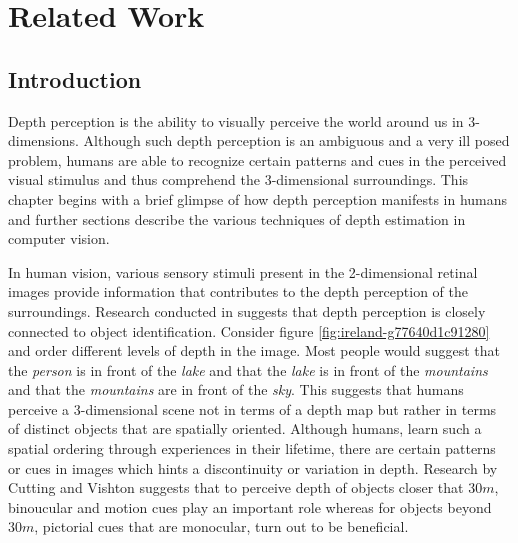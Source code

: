 %
\chapter{Related Work}
\label{sec:related}






\section{Introduction}
\label{sec:related:sec1}
Depth perception is the ability to visually perceive the world around us in 3-dimensions. Although such depth perception is an ambiguous and a very ill posed problem, humans are able to recognize certain patterns and cues in the perceived visual stimulus and thus comprehend the  3-dimensional surroundings. 
This chapter begins with a brief glimpse of how depth perception manifests in humans and further sections describe the various techniques of depth estimation in computer vision.  

In human vision, various sensory stimuli present in the  2-dimensional retinal images provide information that contributes to the depth perception of the surroundings.
Research conducted in \cite{koenderink1998pictorial} suggests that depth perception is closely connected to object identification.
Consider figure \ref{fig:ireland-g77640d1c91280} and order different levels of depth in the image. Most people would suggest that the \textit{person} is in front of the \textit{lake} and that the \textit{lake} is in front of the \textit{mountains} and that the \textit{mountains} are in front of the \textit{sky}. This suggests that humans perceive a 3-dimensional scene not in terms of a depth map but rather in terms of distinct objects that are spatially oriented.
Although humans, learn such a spatial ordering through experiences in their lifetime, there are certain patterns or cues in images which hints a discontinuity or variation in depth. Research by Cutting and Vishton \cite{cutting1995perceiving} suggests that to perceive depth of objects closer that $ 30m $, binoucular and motion cues play an important role whereas for objects beyond $30m$, pictorial cues that are monocular, turn out to be beneficial.


